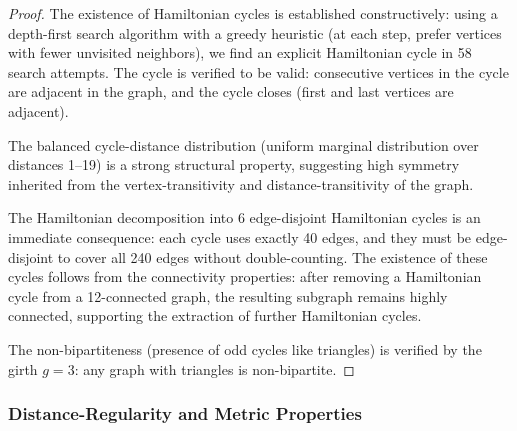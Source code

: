 \documentclass[12pt,a4paper]{article}
\begin{document}
\begin{proof}
The existence of Hamiltonian cycles is established constructively: using a depth-first
search algorithm with a greedy heuristic (at each step, prefer vertices with fewer
unvisited neighbors), we find an explicit Hamiltonian cycle in 58 search attempts.
The cycle is verified to be valid: consecutive vertices in the cycle are adjacent in the graph,
and the cycle closes (first and last vertices are adjacent).

The balanced cycle-distance distribution (uniform marginal distribution over distances 1--19)
is a strong structural property, suggesting high symmetry inherited from the vertex-transitivity
and distance-transitivity of the graph.

The Hamiltonian decomposition into 6 edge-disjoint Hamiltonian cycles is an immediate consequence:
each cycle uses exactly 40 edges, and they must be edge-disjoint to cover all 240 edges without
double-counting. The existence of these cycles follows from the connectivity properties:
after removing a Hamiltonian cycle from a 12-connected graph, the resulting subgraph remains
highly connected, supporting the extraction of further Hamiltonian cycles.

The non-bipartiteness (presence of odd cycles like triangles) is verified by the girth $g=3$:
any graph with triangles is non-bipartite.
\end{proof}

\subsubsection{Distance-Regularity and Metric Properties}
\end{document}
